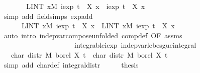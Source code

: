 {\ \ \isamarkupfalse%
\ \isamarkupfalse%
\ {\isachardoublequoteopen}{\isasymdots}\ {\isacharequal}\ {\isacharparenleft}LINT\ x{\isacharbar}M{\isachardot}\ iexp\ {\isacharparenleft}t\ {\isacharasterisk}\ {\isacharparenleft}X{}\ x{\isacharparenright}{\isacharparenright}\ {\isacharasterisk}\ iexp\ {\isacharparenleft}t\ {\isacharasterisk}\ {\isacharparenleft}X{}\ x{\isacharparenright}{\isacharparenright}{\isacharparenright}{\isachardoublequoteclose}\isanewline
\ \ \ \ \isamarkupfalse%
\ {\isacharparenleft}simp\ add{\isacharcolon}\ field{\isacharunderscore}simps\ exp{\isacharunderscore}add{\isacharparenright}\isanewline
\ \ \isamarkupfalse%
\ \isamarkupfalse%
\ {\isachardoublequoteopen}{\isasymdots}\ {\isacharequal}\isanewline
\ \ \ \ \ \ {\isacharparenleft}LINT\ x{\isacharbar}M{\isachardot}\ iexp\ {\isacharparenleft}t\ {\isacharasterisk}\ {\isacharparenleft}X{}\ x{\isacharparenright}{\isacharparenright}{\isacharparenright}\ {\isacharasterisk}\ {\isacharparenleft}LINT\ x{\isacharbar}M{\isachardot}\ iexp\ {\isacharparenleft}t\ {\isacharasterisk}\ {\isacharparenleft}X{}\ x{\isacharparenright}{\isacharparenright}{\isacharparenright}{\isachardoublequoteclose}\isanewline
\ \ \ \ \isamarkupfalse%
\ {\isacharparenleft}auto\ intro{\isacharbang}{\isacharcolon}\ indep{\isacharunderscore}var{\isacharunderscore}compose{\isacharbrackleft}unfolded\ comp{\isacharunderscore}def{\isacharcomma}\ OF\ assms{\isacharbrackright}\isanewline
\ \ \ \ \ \ \ \ \ \ \ \ \ \ \ \ \ \ \ \ \ integrable{\isacharunderscore}iexp\ indep{\isacharunderscore}var{\isacharunderscore}lebesgue{\isacharunderscore}integral{\isacharparenright}\isanewline
\ \ \isamarkupfalse%
\ \isamarkupfalse%
\ {\isachardoublequoteopen}{\isasymdots}\ {\isacharequal}\ char\ {\isacharparenleft}distr\ M\ borel\ X{}{\isacharparenright}\ t\ {\isacharasterisk}\ char\ {\isacharparenleft}distr\ M\ borel\ X{}{\isacharparenright}\ t{\isachardoublequoteclose}\isanewline
\ \ \ \ \isamarkupfalse%
\ {\isacharparenleft}simp\ add{\isacharcolon}\ char{\isacharunderscore}def\ integral{\isacharunderscore}distr{\isacharparenright}\isanewline
\ \ \isamarkupfalse%
\ \isamarkupfalse%
\ {\isacharquery}thesis\ \isacommand{{\isachardot}}\isamarkupfalse%
\isanewline
{}\isamarkupfalse%
%
\endisatagproof
{\isafoldproof}%
%
\isadelimproof
%
\endisadelimproof
%
}%
